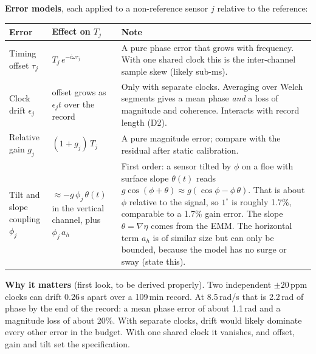 \documentclass[10pt,a4paper]{article}
\begin{document}
\textbf{Error models}, each applied to a non-reference sensor $j$ relative to the reference:
\begin{center}\small
\begin{tabularx}{\linewidth}{@{}l l L@{}}
\toprule
Error & Effect on $T_j$ & Note \\
\midrule
Timing offset $\tau_j$ & $T_j\,e^{-i\omega\tau_j}$ & A pure phase error that grows with frequency. With one shared clock this is the inter-channel sample skew (likely sub-ms). \\
Clock drift $\epsilon_j$ & offset grows as $\epsilon_j t$ over the record & Only with separate clocks. Averaging over Welch segments gives a mean phase \emph{and} a loss of magnitude and coherence. Interacts with record length (D2). \\
Relative gain $g_j$ & $(1+g_j)\,T_j$ & A pure magnitude error; compare with the residual after static calibration. \\
Tilt and slope coupling $\phi_j$ & $\approx -g\,\phi_j\,\theta(t)$ in the vertical channel, plus $\phi_j\,a_h$ & First order: a sensor tilted by $\phi$ on a floe with surface slope $\theta(t)$ reads $g\cos(\phi+\theta)\approx g(\cos\phi-\phi\,\theta)$. That is about $\phi$ relative to the signal, so $1^\circ$ is roughly 1.7\%, comparable to a 1.7\% gain error. The slope $\theta=\nabla\eta$ comes from the EMM. The horizontal term $a_h$ is of similar size but can only be bounded, because the model has no surge or sway (state this). \\
\bottomrule
\end{tabularx}
\end{center}

\textbf{Why it matters} (first look, to be derived properly). Two independent $\pm20$\,ppm clocks can drift 0.26\,s apart over a 109\,min record. At 8.5\,rad/s that is 2.2\,rad of phase by the end of the record: a mean phase error of about 1.1\,rad and a magnitude loss of about 20\%. With separate clocks, drift would likely dominate every other error in the budget. With one shared clock it vanishes, and offset, gain and tilt set the specification.
\end{document}

